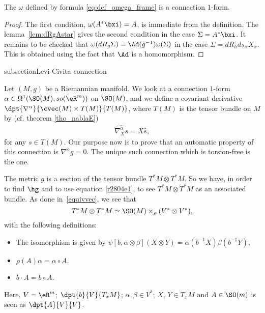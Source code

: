 \begin{proposition}
The $\omega$ defined by formula \eqref{eq:def_omega_frame} is a connection $1$-form.
\label{prop_omconfrom}
\end{proposition}

\begin{proof}
The first condition, $\omega(A^*\bxi)=A$, is immediate from the definition. The lemma~\ref{lem:dRgAstar} gives the second condition in the case $\Sigma=A^*\bxi$. It remains to be checked that $\omega(dR_g\Sigma)=\Ad(g^{-1})\omega(\Sigma)$ in the case $\Sigma=dR_hds_{\alpha} X_x$. This is obtained using the fact that $\Ad$ is a homomorphism.
\end{proof}

subsection{Levi-Civita connection}\label{subsection_levi}

Let $(M,g)$ be a Riemannian manifold. We look at a connection $1$-form $\alpha\in\Omega^1(\SO(M),so(\eR^m))$ on $\SO(M)$, and we define a covariant derivative $\dpt{\nabla^{\alpha}}{\cvec(M)\times T(M)}{T(M)}$, where $T(M)$ is the tensor bundle on $M$ by (cf. theorem \eqref{tho_nablaE})
\begin{eqnarray}\label{r2804e1}
 \widehat{\nabla^{\alpha}_X s}=\overline{X}\hat{s},
\end{eqnarray}
for any $s\in T(M)$.  Our purpose now is to prove that an automatic property of this connection is $\nabla^{\alpha} g=0$. The unique such connection which is torsion-free is the  one.

The metric $g$ is a section of the tensor bundle $T^*M\otimes T^*M$. So we have, in order to find $\hg$ and to use equation \eqref{r2804e1}, to see $T^*M\otimes T^*M$ as an associated bundle. As done in~\ref{equivvec}, we see that
\[
 T^*M\otimes T^*M\simeq \SO(M)\times_{\rho}(V^*\otimes V^*),
\]
with the following definitions:
\begin{itemize}
\item The isomorphism is given by $\psi[b,\alpha\otimes\beta](X\otimes Y)=\alpha(b^{-1} X)\beta(b^{-1} Y)$,
\item $\rho(A)\alpha=\alpha\circ A$,
\item $b\cdot A=b\circ A$.
\end{itemize}
Here, $V=\eR^m$; $\dpt{b}{V}{T_xM}$; $\alpha,\beta\in V^*$; $X$, $Y\in T_xM$ and $A\in \SO(m)$ is seen as $\dpt{A}{V}{V}$.

